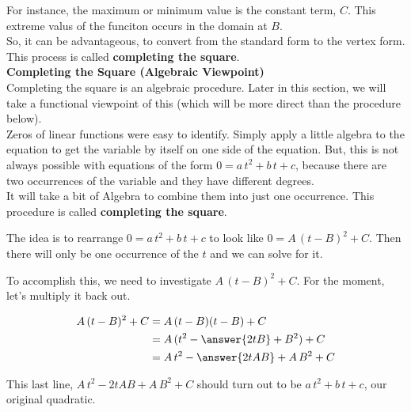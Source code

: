 \documentclass{ximera}
\begin{document}
For instance, the maximum or minimum value is the constant term, $C$.  This extreme valus of the funciton occurs in the domain at $B$. \\


So, it can be advantageous, to convert from the standard form to the vertex form.  This process is called \textbf{completing the square}. \\




\textbf{\textcolor{blue!55!black}{Completing the Square (Algebraic Viewpoint)}} \\

Completing the square is an algebraic procedure.  Later in this section, we will take a functional viewpoint of this (which will be more direct than the procedure below). \\



Zeros of linear functions were easy to identify.  Simply apply a little algebra to the equation to get the variable by itself on one side of the equation.  But, this is not always possible with equations of the form $0 = a \, t^2 + b \, t + c $, because there are two occurrences of the variable and they have different degrees. \\


It will take a bit of Algebra to combine them into just one occurrence. This procedure is called \textbf{completing the square}. \\



\begin{idea}


The idea is to rearrange  $0 = a \, t^2 + b \, t + c$ to look like $0 = A \, (t-B)^2 + C$.  Then there will only be  one occurrence of the $t$ and we can solve for it.


To accomplish this, we need to investigate $A \, (t-B)^2 + C$. For the moment, let's multiply it back out.


\begin{align*}
A \, (t-B)^2 + C & = A \, (t-B)(t-B) + C \\
& = A \, (t^2 - \answer{2 t B} + B^2) + C  \\
& = A \, t^2 - \answer{2 t A B} + A \, B^2 + C
\end{align*}

This last line, $A \, t^2 - 2 t A B + A \, B^2 + C$ should turn out to be $a \, t^2 + b \, t + c$, our original quadratic.

\end{idea}
\end{document}
